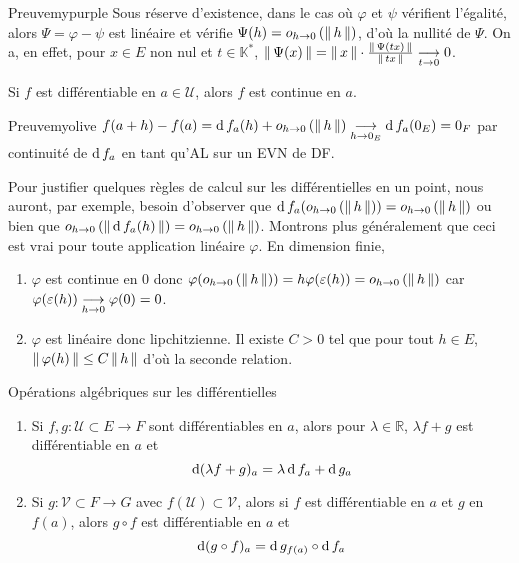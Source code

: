     \begin{demo}{Preuve}{mypurple}
        Sous réserve d’existence, dans le cas où $\varphi$ et $\psi$ vérifient l’égalité, alors $\Psi = \varphi - \psi$ est linéaire et vérifie $\Psi(h) = o_{h \rightarrow 0} \left(\left\lVert \,h \, \right\rVert\right)$, d’où la nullité de $\Psi$. On a, en effet, pour $x \in E$ non nul et $t \in \mathbb{K}^*$, $\left\lVert \,\Psi(x) \, \right\rVert = \left\lVert \,x \, \right\rVert \cdot \frac{\left\lVert \,\Psi(tx) \, \right\rVert}{\left\lVert \,tx \, \right\rVert} \underset{t \rightarrow 0}{\longrightarrow} 0$.
    \end{demo}

    \begin{prop}{}{}
        Si $f$ est différentiable en $a \in \mathcal{U}$, alors $f$ est continue en $a$. 
    \end{prop}

    \begin{demo}{Preuve}{myolive}
        $f(a+h) - f(a) = \operatorname{d} f_a(h) + o_{h \rightarrow 0} \left(\left\lVert \,h \, \right\rVert\right) \underset{h \rightarrow 0_E}{\longrightarrow} \operatorname{d} f_a(0_E) = 0_F$ par continuité de $\operatorname{d} f_a$ en tant qu’AL sur un EVN de DF. 
    \end{demo}

    Pour justifier quelques règles de calcul sur les différentielles en un point, nous auront, par exemple, besoin d’observer que $\operatorname{d} f_a(o_{h \rightarrow 0} \left(\left\lVert \,h \, \right\rVert\right)) = o_{h \rightarrow 0} \left(\left\lVert \,h \, \right\rVert\right)$ ou bien que $o_{h \rightarrow 0} \left(\left\lVert \,\operatorname{d} f_a(h) \, \right\rVert\right) = o_{h \rightarrow 0} \left(\left\lVert \,h \, \right\rVert\right)$. Montrons plus généralement que ceci est vrai pour toute application linéaire $\varphi$. En dimension finie, 
    \begin{enumerate}
        \item $\varphi$ est continue en 0 donc $\varphi(o_{h \rightarrow 0} \left(\left\lVert \,h \, \right\rVert\right)) = h \varphi(\varepsilon(h)) = o_{h \rightarrow 0} \left(\left\lVert \,h \, \right\rVert\right)$ car $\varphi(\varepsilon(h)) \underset{h \rightarrow 0}{\longrightarrow} \varphi(0) = 0$. 
        \item $\varphi$ est linéaire donc lipchitzienne. Il existe $C > 0$ tel que pour tout $h \in E$, $\left\lVert \,\varphi(h) \, \right\rVert \leq C \left\lVert \,h \, \right\rVert$ d’où la seconde relation. 
    \end{enumerate}

    \begin{prop}{Opérations algébriques sur les différentielles}{}
        \begin{enumerate}
            \item Si $f,g : \mathcal{U} \subset E \to F$ sont différentiables en $a$, alors pour $\lambda \in \mathbb{R}$, $\lambda f + g$ est différentiable en $a$ et 
            \[ \operatorname{d} (\lambda f + g)_a = \lambda \operatorname{d} f_a + \operatorname{d} g_a \]   
            \item Si $g : \mathcal{V} \subset F \to G$ avec $f(\mathcal{U}) \subset \mathcal{V}$, alors si $f$ est différentiable en $a$ et $g$ en $f(a)$, alors $g \circ f$ est différentiable en $a$ et 
            \[ \operatorname{d} (g \circ f)_a = \operatorname{d} g_{f(a)} \circ \operatorname{d} f_a \]  
        \end{enumerate}
    \end{prop}

